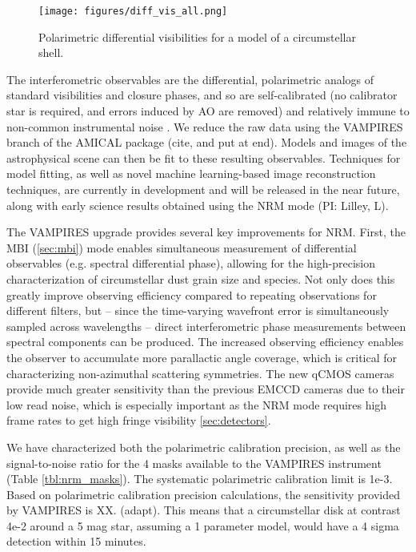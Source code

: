 \begin{figure}[h]
\centering
    \texttt{[image: figures/diff\_vis\_all.png]}
    \caption{Polarimetric differential visibilities for a model of a circumstellar shell. \label{fig:diff_vis_all}}
\end{figure}

The interferometric observables are the differential, polarimetric analogs of standard visibilities and closure phases, and so are self-calibrated (no calibrator star is required, and errors induced by AO are removed) and relatively immune to non-common instrumental noise \citep{norris_vampires_2015}. We reduce the raw data using the VAMPIRES branch of the AMICAL package (cite, and put at end). Models and images of the astrophysical scene can then be fit to these resulting observables. Techniques for model fitting, as well as novel machine learning-based image reconstruction techniques, are currently in development and will be released in the near future, along with early science results obtained using the NRM mode (PI: Lilley, L). 
 
The VAMPIRES upgrade provides several key improvements for NRM. First, the MBI (\autoref{sec:mbi}) mode enables simultaneous measurement of differential observables (e.g. spectral differential phase), allowing for the high-precision characterization of circumstellar dust grain size and species. Not only does this greatly improve observing efficiency compared to repeating observations for different filters, but -- since the time-varying wavefront error is simultaneously sampled across wavelengths -- direct interferometric phase measurements between spectral components can be produced. 
The increased observing efficiency enables the observer to accumulate more parallactic angle coverage, which is critical for characterizing non-azimuthal scattering symmetries. The new qCMOS cameras provide much greater sensitivity than the previous EMCCD cameras due to their low read noise, which is especially important as the NRM mode requires high frame rates to get high fringe visibility \autoref{sec:detectors}.  
 
We have characterized both the polarimetric calibration precision, as well as the signal-to-noise ratio for the 4 masks available to the VAMPIRES instrument (Table \ref{tbl:nrm_masks}). The systematic polarimetric calibration limit is 1e-3. Based on polarimetric calibration precision calculations, the sensitivity provided by VAMPIRES is XX. (adapt). This means that a circumstellar disk at contrast 4e-2 around a 5 mag star, assuming a 1 parameter model, would have a 4 sigma detection within 15 minutes. 

